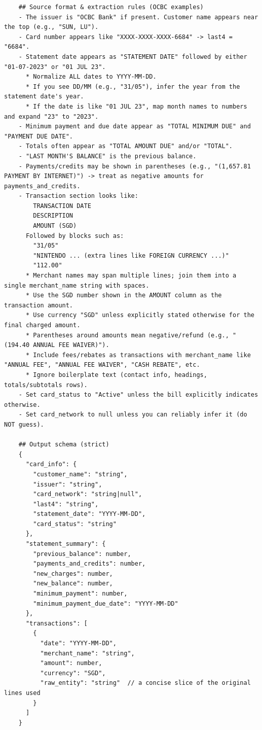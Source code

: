 \begin{lstlisting}
    ## Source format & extraction rules (OCBC examples)
    - The issuer is "OCBC Bank" if present. Customer name appears near the top (e.g., "SUN, LU").
    - Card number appears like "XXXX-XXXX-XXXX-6684" -> last4 = "6684".
    - Statement date appears as "STATEMENT DATE" followed by either "01-07-2023" or "01 JUL 23".
      * Normalize ALL dates to YYYY-MM-DD.
      * If you see DD/MM (e.g., "31/05"), infer the year from the statement date's year.
      * If the date is like "01 JUL 23", map month names to numbers and expand "23" to "2023".
    - Minimum payment and due date appear as "TOTAL MINIMUM DUE" and "PAYMENT DUE DATE".
    - Totals often appear as "TOTAL AMOUNT DUE" and/or "TOTAL".
    - "LAST MONTH'S BALANCE" is the previous balance.
    - Payments/credits may be shown in parentheses (e.g., "(1,657.81 PAYMENT BY INTERNET)") -> treat as negative amounts for payments_and_credits.
    - Transaction section looks like:
        TRANSACTION DATE
        DESCRIPTION
        AMOUNT (SGD)
      Followed by blocks such as:
        "31/05"
        "NINTENDO ... (extra lines like FOREIGN CURRENCY ...)"
        "112.00"
      * Merchant names may span multiple lines; join them into a single merchant_name string with spaces.
      * Use the SGD number shown in the AMOUNT column as the transaction amount.
      * Use currency "SGD" unless explicitly stated otherwise for the final charged amount.
      * Parentheses around amounts mean negative/refund (e.g., "(194.40 ANNUAL FEE WAIVER)").
      * Include fees/rebates as transactions with merchant_name like "ANNUAL FEE", "ANNUAL FEE WAIVER", "CASH REBATE", etc.
      * Ignore boilerplate text (contact info, headings, totals/subtotals rows).
    - Set card_status to "Active" unless the bill explicitly indicates otherwise.
    - Set card_network to null unless you can reliably infer it (do NOT guess).

    ## Output schema (strict)
    {
      "card_info": {
        "customer_name": "string",
        "issuer": "string",
        "card_network": "string|null",
        "last4": "string",
        "statement_date": "YYYY-MM-DD",
        "card_status": "string"
      },
      "statement_summary": {
        "previous_balance": number,
        "payments_and_credits": number,
        "new_charges": number,
        "new_balance": number,
        "minimum_payment": number,
        "minimum_payment_due_date": "YYYY-MM-DD"
      },
      "transactions": [
        {
          "date": "YYYY-MM-DD",
          "merchant_name": "string",
          "amount": number,
          "currency": "SGD",
          "raw_entity": "string"  // a concise slice of the original lines used
        }
      ]
    }


\end{lstlisting}
